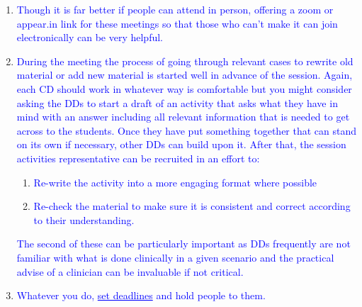 \documentclass[11pt]{article}
\newcommand{\trsem}[1]{\textcolor{blue}{#1}}
\begin{document}
\begin{enumerate}
\item \trsem{Though it is far better if people can attend in person, offering a zoom or appear.in link for these meetings so that those who can't make it can join electronically can be very helpful.}
\item \trsem{During the meeting the process of going through relevant cases to rewrite old material or add new material is started well in advance of the session.  Again, each CD should work in whatever way is comfortable but you might consider asking the DDs to start a draft of an activity that asks what they have in mind with an answer including all relevant information that is needed to get across to the students.  Once they have put something together that can stand on its own if necessary, other DDs can build upon it.  After that, the session activities representative can be recruited in an effort to:}
  \begin{enumerate}
          \def\labelenumii{\trsem{\alph{enumii}.}}
  \item \trsem{Re-write the activity into a more engaging format where possible}
  \item \trsem{Re-check the material to make sure it is consistent and correct according to their understanding.}
  \end{enumerate}
  \trsem{The second of these can be particularly important as DDs frequently are not familiar with what is done clinically in a given scenario and the practical advise of a clinician can be invaluable if not critical.}
\item \trsem{Whatever you do, \underline{set deadlines} and hold people to them.}
\end{enumerate}

  
\end{document}

